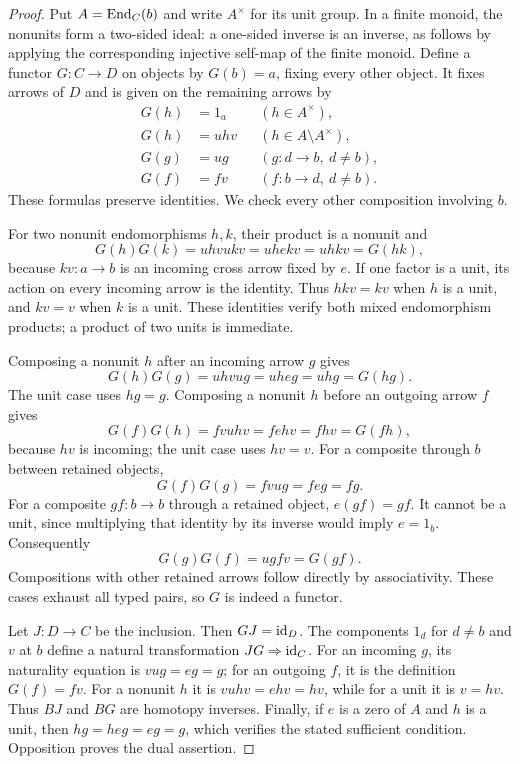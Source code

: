 \begin{proof}
Put $A=\operatorname{End}_C(b)$ and write $A^\times$ for its unit group.
In a finite monoid, the nonunits form a two-sided ideal: a
one-sided inverse is an inverse, as follows by applying the
corresponding injective self-map of the finite monoid.
Define a functor $G:C\to D$ on objects by $G(b)=a$, fixing
every other object.  It fixes arrows of $D$ and is given on
the remaining arrows by
\begin{align*}
 G(h)&=1_a &&(h\in A^\times),\\
 G(h)&=uhv &&(h\in A\setminus A^\times),\\
 G(g)&=ug &&(g:d\to b,\ d\ne b),\\
 G(f)&=fv &&(f:b\to d,\ d\ne b).
\end{align*}
These formulas preserve identities.  We check every other
composition involving $b$.

For two nonunit endomorphisms $h,k$, their product is a nonunit
and
\[
 G(h)G(k)=uhvukv=uhekv=uhkv=G(hk),
\]
because $kv:a\to b$ is an incoming cross arrow fixed by $e$.
If one factor is a unit, its action on every incoming arrow is
the identity.  Thus $hkv=kv$ when $h$ is a unit, and $kv=v$
when $k$ is a unit.  These identities verify both mixed
endomorphism products; a product of two units is immediate.

Composing a nonunit $h$ after an incoming arrow $g$ gives
\[
 G(h)G(g)=uhvug=uheg=uhg=G(hg).
\]
The unit case uses $hg=g$.  Composing a nonunit $h$ before an
outgoing arrow $f$ gives
\[
 G(f)G(h)=fvuhv=fehv=fhv=G(fh),
\]
because $hv$ is incoming; the unit case uses $hv=v$.
For a composite through $b$ between retained objects,
\[
 G(f)G(g)=fvug=feg=fg.
\]
For a composite $gf:b\to b$ through a retained object,
$e(gf)=gf$.  It cannot be a unit, since multiplying that
identity by its inverse would imply $e=1_b$.  Consequently
\[
 G(g)G(f)=ugfv=G(gf).
\]
Compositions with other retained arrows follow directly by
associativity.  These cases exhaust all typed pairs, so $G$
is indeed a functor.

Let $J:D\to C$ be the inclusion.  Then $GJ=\mathrm {id}_D$.
The components $1_d$ for $d\ne b$ and $v$ at $b$ define a
natural transformation $JG\Rightarrow\mathrm {id}_C$.  For an incoming
$g$, its naturality equation is $vug=eg=g$; for an outgoing
$f$, it is the definition $G(f)=fv$.  For a nonunit $h$ it is
$vuhv=ehv=hv$, while for a unit it is $v=hv$.
Thus $BJ$ and $BG$ are homotopy inverses.
Finally, if $e$ is a zero of $A$ and $h$ is a unit, then
$hg=heg=eg=g$, which verifies the stated sufficient condition.
Opposition proves the dual assertion.
\end{proof}

